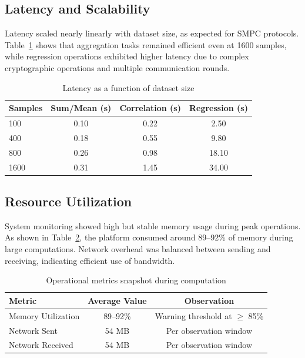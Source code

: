 \documentclass[conference]{IEEEtran}
\begin{document}
\subsection{Latency and Scalability}
Latency scaled nearly linearly with dataset size, as expected for SMPC protocols. Table~\ref{tab:latency} shows that aggregation tasks remained efficient even at 1600 samples, while regression operations exhibited higher latency due to complex cryptographic operations and multiple communication rounds.

\begin{table}[H]
\centering
\caption{Latency as a function of dataset size}
\label{tab:latency}
\begin{tabular}{lccc}
\toprule
\textbf{Samples} & \textbf{Sum/Mean (s)} & \textbf{Correlation (s)} & \textbf{Regression (s)} \\
\midrule
100 & 0.10 & 0.22 & 2.50 \\
400 & 0.18 & 0.55 & 9.80 \\
800 & 0.26 & 0.98 & 18.10 \\
1600 & 0.31 & 1.45 & 34.00 \\
\bottomrule
\end{tabular}
\end{table}

\subsection{Resource Utilization}
System monitoring showed high but stable memory usage during peak operations. As shown in Table~\ref{tab:ops}, the platform consumed around 89–92\% of memory during large computations. Network overhead was balanced between sending and receiving, indicating efficient use of bandwidth.

\begin{table}[H]
\centering
\caption{Operational metrics snapshot during computation}
\label{tab:ops}
\begin{tabular}{lcc}
\toprule
\textbf{Metric} & \textbf{Average Value} & \textbf{Observation} \\
\midrule
Memory Utilization & 89--92\% & Warning threshold at $\geq$ 85\% \\
Network Sent & 54 MB & Per observation window \\
Network Received & 54 MB & Per observation window \\
\bottomrule
\end{tabular}
\end{table}
\end{document}
